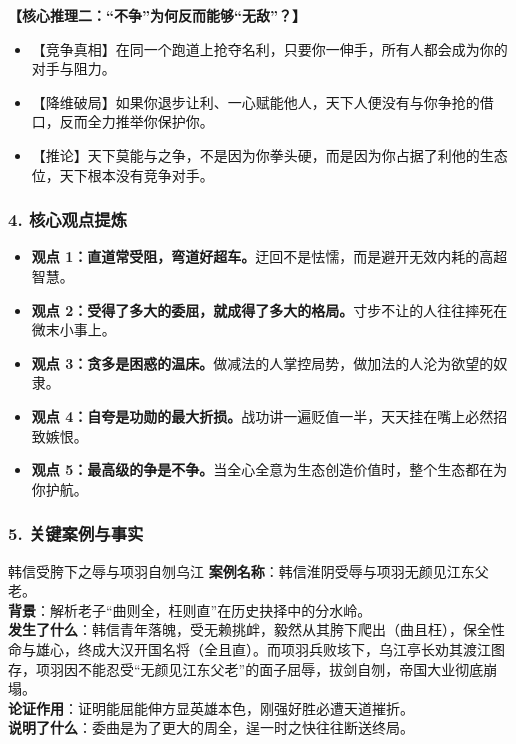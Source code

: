 \noindent\textbf{【核心推理二：“不争”为何反而能够“无敌”？】}
\begin{itemize}
    \item 【竞争真相】在同一个跑道上抢夺名利，只要你一伸手，所有人都会成为你的对手与阻力。
    \item 【降维破局】如果你退步让利、一心赋能他人，天下人便没有与你争抢的借口，反而全力推举你保护你。
    \item 【推论】天下莫能与之争，不是因为你拳头硬，而是因为你占据了利他的生态位，天下根本没有竞争对手。
\end{itemize}

\subsubsection{4. 核心观点提炼}
\begin{itemize}
    \item \textbf{观点 1：直道常受阻，弯道好超车。}迂回不是怯懦，而是避开无效内耗的高超智慧。
    \item \textbf{观点 2：受得了多大的委屈，就成得了多大的格局。}寸步不让的人往往摔死在微末小事上。
    \item \textbf{观点 3：贪多是困惑的温床。}做减法的人掌控局势，做加法的人沦为欲望的奴隶。
    \item \textbf{观点 4：自夸是功勋的最大折损。}战功讲一遍贬值一半，天天挂在嘴上必然招致嫉恨。
    \item \textbf{观点 5：最高级的争是不争。}当全心全意为生态创造价值时，整个生态都在为你护航。
\end{itemize}

\subsubsection{5. 关键案例与事实}
\begin{CaseBox}{韩信受胯下之辱与项羽自刎乌江}
\textbf{案例名称}：韩信淮阴受辱与项羽无颜见江东父老。\\
\textbf{背景}：解析老子“曲则全，枉则直”在历史抉择中的分水岭。\\
\textbf{发生了什么}：韩信青年落魄，受无赖挑衅，毅然从其胯下爬出（曲且枉），保全性命与雄心，终成大汉开国名将（全且直）。而项羽兵败垓下，乌江亭长劝其渡江图存，项羽因不能忍受“无颜见江东父老”的面子屈辱，拔剑自刎，帝国大业彻底崩塌。\\
\textbf{论证作用}：证明能屈能伸方显英雄本色，刚强好胜必遭天道摧折。\\
\textbf{说明了什么}：委曲是为了更大的周全，逞一时之快往往断送终局。
\end{CaseBox}


